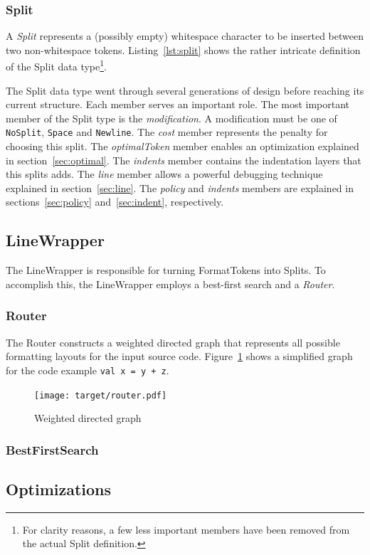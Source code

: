 \subsubsection{Split}
A \emph{Split} represents a (possibly empty) whitespace character to be inserted between two non-whitespace tokens.
Listing~\ref{lst:split} shows the rather intricate definition of the Split data type\footnote{
  For clarity reasons, a few less important members have been removed from the actual Split definition.}.

The Split data type went through several generations of design before reaching its current structure.
Each member serves an important role.
The most important member of the Split type is the \emph{modification}.
A modification must be one of \texttt{NoSplit}, \texttt{Space} and \texttt{Newline}.
The \emph{cost} member represents the penalty for choosing this split.
The \emph{optimalToken} member enables an optimization explained in section~\ref{sec:optimal}.
The \emph{indents} member contains the indentation layers that this splits adds.
The \emph{line} member allows a powerful debugging technique explained in section~\ref{sec:line}.
The \emph{policy} and \emph{indents} members are explained in sections~\ref{sec:policy} and~\ref{sec:indent}, respectively.

\subsection{LineWrapper}
The LineWrapper is responsible for turning FormatTokens into Splits.
To accomplish this, the LineWrapper employs a best-first search and a \emph{Router}.
\subsubsection{Router}\label{sec:router}
The Router constructs a weighted directed graph that represents all possible formatting layouts for the input source code.
Figure~\ref{fig:router} shows a simplified graph for the code example \texttt{val x = y + z}.
\begin{figure}
  \centering
  \texttt{[image: target/router.pdf]}
  \caption{Weighted directed graph}
  \label{fig:router}
\end{figure}
\subsubsection{BestFirstSearch}
\subsection{Optimizations}
